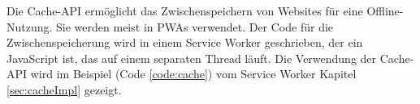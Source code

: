 
Die Cache-API ermöglicht das Zwischenspeichern von Websites für eine Offline-Nutzung. Sie werden meist in PWAs verwendet. Der Code für die Zwischenspeicherung wird in einem Service Worker geschrieben, der ein JavaScript ist, das auf einem separaten Thread läuft. Die Verwendung der Cache-API wird im Beispiel (Code \ref{code:cache}) vom Service Worker Kapitel \ref{sec:cacheImpl} gezeigt.